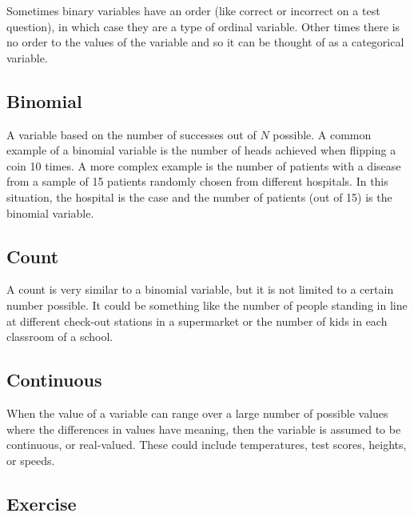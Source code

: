 \documentclass[
]{book}
\theoremstyle{definition}
\theoremstyle{definition}
\theoremstyle{definition}
\theoremstyle{definition}
\theoremstyle{remark}
\begin{document}
Sometimes binary variables have an order (like correct or incorrect on a test question), in which case they are a type of ordinal variable. Other times there is no order to the values of the variable and so it can be thought of as a categorical variable.

\hypertarget{binomial}{%
\subsection{Binomial}\label{binomial}}

A variable based on the number of successes out of \(N\) possible. A common example of a binomial variable is the number of heads achieved when flipping a coin 10 times. A more complex example is the number of patients with a disease from a sample of 15 patients randomly chosen from different hospitals. In this situation, the hospital is the case and the number of patients (out of 15) is the binomial variable.

\hypertarget{count}{%
\subsection{Count}\label{count}}

A count is very similar to a binomial variable, but it is not limited to a certain number possible. It could be something like the number of people standing in line at different check-out stations in a supermarket or the number of kids in each classroom of a school.

\hypertarget{continuous}{%
\subsection{Continuous}\label{continuous}}

When the value of a variable can range over a large number of possible values where the differences in values have meaning, then the variable is assumed to be continuous, or real-valued. These could include temperatures, test scores, heights, or speeds.

\hypertarget{exercise}{%
\subsection{Exercise}\label{exercise}}
\end{document}
